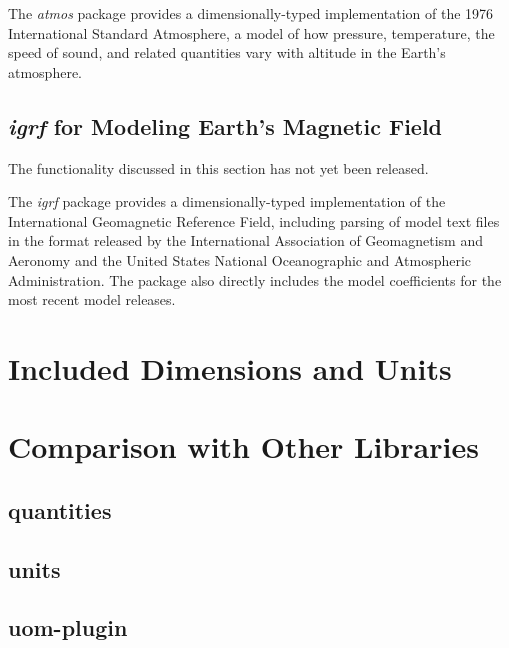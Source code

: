 \documentclass[11pt]{report}
\newcommand{\packagename}[1]{\textit{#1}}
\newcommand{\prerelease}{\begin{framed}
The functionality discussed in this section has not yet been released.
\end{framed}}
\begin{document}
The \packagename{atmos} package provides a dimensionally-typed implementation of the 1976 International Standard
Atmosphere, a model of how pressure, temperature, the speed of sound, and related quantities vary with
altitude in the Earth's atmosphere.

\section{\packagename{igrf} for Modeling Earth's Magnetic Field}

\prerelease{}

The \packagename{igrf} package provides a dimensionally-typed implementation of the International Geomagnetic
Reference Field, including parsing of model text files in the format released by the International Association of
Geomagnetism and Aeronomy and the United States National Oceanographic and Atmospheric Administration. The
package also directly includes the model coefficients for the most recent model releases.

\chapter{Included Dimensions and Units}

\chapter{Comparison with Other Libraries}

\section{quantities}
\section{units}
\section{uom-plugin}
\end{document}
